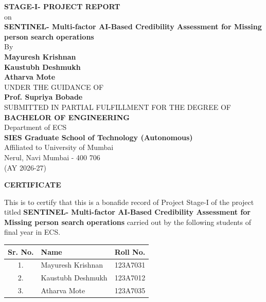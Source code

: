 \documentclass[12pt,a4paper]{report}
\begin{document}
\begin{titlepage}
\begin{center}
\vspace*{1cm}
{\Large \textbf{STAGE-I- PROJECT REPORT}} \\
\vspace{0.5cm}
on \\
\vspace{0.5cm}
{\Large \textbf{SENTINEL- Multi-factor AI-Based Credibility Assessment for Missing person search operations}} \\
\vspace{1.5cm}
By \\
\vspace{0.5cm}
\textbf{Mayuresh Krishnan} \\
\textbf{Kaustubh Deshmukh} \\
\textbf{Atharva Mote} \\
\vspace{1.5cm}
UNDER THE GUIDANCE OF \\
\textbf{Prof. Supriya Bobade} \\
\vspace{1.5cm}
SUBMITTED IN PARTIAL FULFILLMENT FOR THE DEGREE OF \\
\textbf{BACHELOR OF ENGINEERING} \\
\vspace{2cm}
Department of ECS \\
\textbf{SIES Graduate School of Technology (Autonomous)} \\
Affiliated to University of Mumbai \\
Nerul, Navi Mumbai - 400 706 \\
(AY 2026-27)
\end{center}
\end{titlepage}

\newpage
\thispagestyle{empty}
\begin{center}
\Large \textbf{CERTIFICATE}
\end{center}
\vspace{1cm}
This is to certify that this is a bonafide record of Project Stage-I of the project titled \textbf{SENTINEL- Multi-factor AI-Based Credibility Assessment for Missing person search operations} carried out by the following students of final year in ECS.

\vspace{0.5cm}
\begin{table}[h]
\centering
\begin{tabular}{|c|l|c|}
\hline
\textbf{Sr. No.} & \textbf{Name} & \textbf{Roll No.} \\ \hline
1. & Mayuresh Krishnan & 123A7031 \\ \hline
2. & Kaustubh Deshmukh & 123A7012 \\ \hline
3. & Atharva Mote & 123A7035 \\ \hline
\end{tabular}
\end{table}
\vspace{0.5cm}
\end{document}
